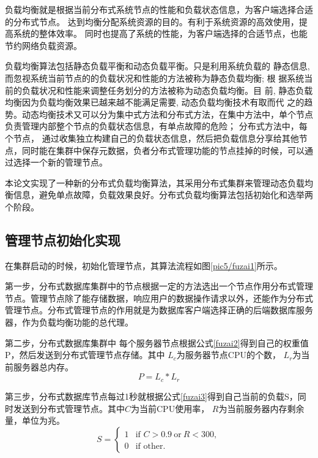 负载均衡就是根据当前分布式系统节点的性能和负载状态信息，为客户端选择合适的分布式节点。
达到均衡分配系统资源的目的。有利于系统资源的高效使用，提高系统的整体效率。
同时也提高了系统的性能，为客户端选择的合适节点，也能节约网络负载资源。


负载均衡算法包括静态负载平衡和动态负载平衡。只是利用系统负载的
静态信息, 而忽视系统当前节点的的负载状况和性能的方法被称为静态负载均衡; 根
据系统当前的负载状况和性能来调整任务划分的方法被称为动态负载均衡。目
前, 静态负载均衡因为负载均衡效果已越来越不能满足需要, 动态负载均衡技术有取而代
之的趋势。动态均衡技术又可以分为集中式方法和分布式方法，在集中方法中，单个节点
负责管理内部整个节点的负载状态信息，有单点故障的危险；
分布式方法中，每个节点，
通过收集独立构建自己的负载状态信息，然后把负载信息分享给其他节点，同时能在集群中保存元数据，负者分布式管理功能的节点挂掉的时候，可以通过选择一个新的管理节点。

本论文实现了一种新的分布式负载均衡算法，其采用分布式集群来管理动态负载均衡信息，避免单点故障，负载效果良好。分布式负载均衡算法包括初始化和选举两个阶段。
\subsection{管理节点初始化实现}
在集群启动的时候，初始化管理节点，其算法流程如图\ref{pic5/fuzai1}所示。

第一步，分布式数据库集群中的节点根据一定的方法选出一个节点作用分布式管理节点。管理节点除了能存储数据，响应用户的数据操作请求以外，还能作为分布式管理节点。分布式管理节点的作用就是为数据库客户端选择正确的后端数据库服务器，作为负载均衡功能的总代理。

第二步，分布式数据库集群中
每个服务器节点根据公式\ref{fuzai2}得到自己的权重值P，然后发送到分布式管理节点存储。其中
$ L_c $为服务器节点CPU的个数， $ L_r $为当前服务器总内存。
\begin{equation}
P=L_c * L_r \label{fuzai2}
\end{equation}

第三步，分布式数据库节点每过1秒就根据公式\ref{fuzai3}得到自己当前的负载S，同时发送到分布式管理节点。其中$ C $为当前CPU使用率， $ R $为当前服务器内存剩余量，单位为兆。
\begin{equation}
S =
\begin{cases}
1 & \text{if } C >0.9 \: \text{or} \: R<300,\\
0 & \text{if } \text{other}.
\end{cases}   \label{fuzai3}
\end{equation}

